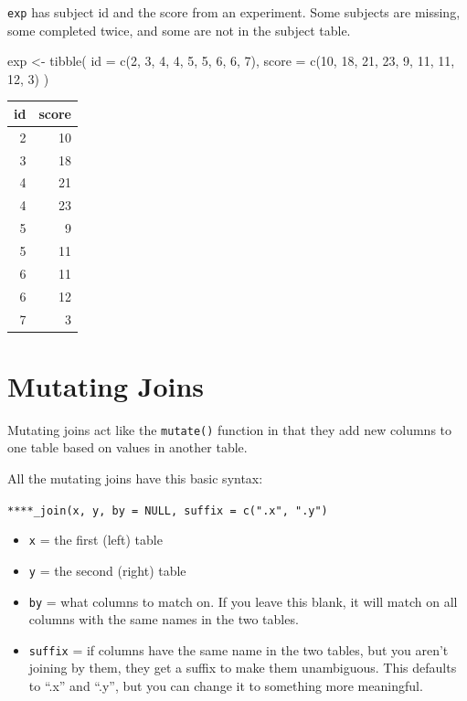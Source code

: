 \documentclass[
  oneside]{book}
\newenvironment{Shaded}{\begin{snugshade}}{\end{snugshade}}
\newcommand{\AttributeTok}[1]{\textcolor[rgb]{0.77,0.63,0.00}{#1}}
\newcommand{\DecValTok}[1]{\textcolor[rgb]{0.00,0.00,0.81}{#1}}
\newcommand{\FunctionTok}[1]{\textcolor[rgb]{0.00,0.00,0.00}{#1}}
\newcommand{\NormalTok}[1]{#1}
\newcommand{\OtherTok}[1]{\textcolor[rgb]{0.56,0.35,0.01}{#1}}
\providecommand{\tightlist}{%
  \setlength{\itemsep}{0pt}\setlength{\parskip}{0pt}}
\begin{document}
\texttt{exp} has subject id and the score from an experiment. Some subjects are missing, some completed twice, and some are not in the subject table.

\begin{Shaded}
\begin{Highlighting}[]
\NormalTok{exp }\OtherTok{\textless{}{-}} \FunctionTok{tibble}\NormalTok{(}
  \AttributeTok{id =} \FunctionTok{c}\NormalTok{(}\DecValTok{2}\NormalTok{, }\DecValTok{3}\NormalTok{, }\DecValTok{4}\NormalTok{, }\DecValTok{4}\NormalTok{, }\DecValTok{5}\NormalTok{, }\DecValTok{5}\NormalTok{, }\DecValTok{6}\NormalTok{, }\DecValTok{6}\NormalTok{, }\DecValTok{7}\NormalTok{),}
  \AttributeTok{score =} \FunctionTok{c}\NormalTok{(}\DecValTok{10}\NormalTok{, }\DecValTok{18}\NormalTok{, }\DecValTok{21}\NormalTok{, }\DecValTok{23}\NormalTok{, }\DecValTok{9}\NormalTok{, }\DecValTok{11}\NormalTok{, }\DecValTok{11}\NormalTok{, }\DecValTok{12}\NormalTok{, }\DecValTok{3}\NormalTok{)}
\NormalTok{)}
\end{Highlighting}
\end{Shaded}

\begin{tabular}{r|r}
\hline
id & score\\
\hline
2 & 10\\
\hline
3 & 18\\
\hline
4 & 21\\
\hline
4 & 23\\
\hline
5 & 9\\
\hline
5 & 11\\
\hline
6 & 11\\
\hline
6 & 12\\
\hline
7 & 3\\
\hline
\end{tabular}

\hypertarget{mutating-joins}{%
\section{Mutating Joins}\label{mutating-joins}}

Mutating joins act like the \texttt{mutate()} function in that they add new columns to one table based on values in another table.

All the mutating joins have this basic syntax:

\texttt{****\_join(x,\ y,\ by\ =\ NULL,\ suffix\ =\ c(".x",\ ".y")}

\begin{itemize}
\tightlist
\item
  \texttt{x} = the first (left) table
\item
  \texttt{y} = the second (right) table
\item
  \texttt{by} = what columns to match on. If you leave this blank, it will match on all columns with the same names in the two tables.
\item
  \texttt{suffix} = if columns have the same name in the two tables, but you aren't joining by them, they get a suffix to make them unambiguous. This defaults to ``.x'' and ``.y'', but you can change it to something more meaningful.
\end{itemize}
\end{document}
